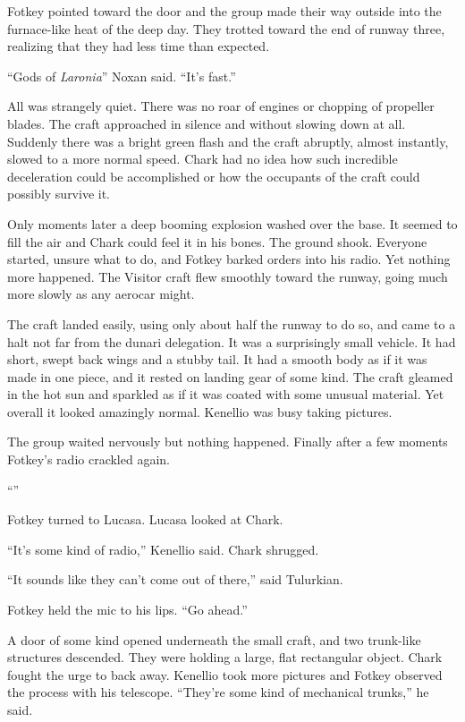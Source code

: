 Fotkey pointed toward the door and the group made their way outside into the furnace-like heat
of the deep day. They trotted toward the end of runway three, realizing that they had less time
than expected.

``Gods of \textit{Laronia}'' Noxan said. ``It's fast.''

All was strangely quiet. There was no roar of engines or chopping of propeller blades. The craft
approached in silence and without slowing down at all. Suddenly there was a bright green flash
and the craft abruptly, almost instantly, slowed to a more normal speed. Chark had no idea how
such incredible deceleration could be accomplished or how the occupants of the craft could
possibly survive it.

Only moments later a deep booming explosion washed over the base. It seemed to fill the air and
Chark could feel it in his bones. The ground shook. Everyone started, unsure what to do, and
Fotkey barked orders into his radio. Yet nothing more happened. The Visitor craft flew smoothly
toward the runway, going much more slowly as any aerocar might.

The craft landed easily, using only about half the runway to do so, and came to a halt not far
from the dunari delegation. It was a surprisingly small vehicle. It had short, swept back wings
and a stubby tail. It had a smooth body as if it was made in one piece, and it rested on landing
gear of some kind. The craft gleamed in the hot sun and sparkled as if it was coated with some
unusual material. Yet overall it looked amazingly normal. Kenellio was busy taking pictures.

The group waited nervously but nothing happened. Finally after a few moments Fotkey's radio
crackled again.

``''

Fotkey turned to Lucasa. Lucasa looked at Chark.

``It's some kind of radio,'' Kenellio said. Chark shrugged.

``It sounds like they can't come out of there,'' said Tulurkian.

Fotkey held the mic to his lips. ``Go ahead.''

A door of some kind opened underneath the small craft, and two trunk-like structures descended.
They were holding a large, flat rectangular object. Chark fought the urge to back away. Kenellio
took more pictures and Fotkey observed the process with his telescope. ``They're some kind of
mechanical trunks,'' he said.

